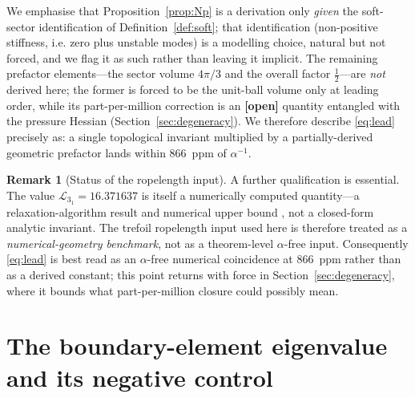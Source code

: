 \documentclass[11pt,a4paper]{article}
\theoremstyle{definition}
\newtheorem{remark}{Remark}
\newcommand{\open}{\textbf{[open]}}
\begin{document}
\noindent We emphasise that Proposition~\ref{prop:Np} is a derivation only
\emph{given} the soft-sector identification of Definition~\ref{def:soft}; that
identification (non-positive stiffness, i.e. zero plus unstable modes) is a
modelling choice, natural but not forced, and we flag it as such rather than
leaving it implicit. The remaining prefactor elements---the sector volume
$4\pi/3$ and the overall factor $\tfrac12$---are \emph{not} derived here; the
former is forced to be the unit-ball volume only at leading order, while its
part-per-million correction is an \open{} quantity entangled with the pressure
Hessian (Section~\ref{sec:degeneracy}). We therefore describe \eqref{eq:lead}
precisely as: a single topological invariant multiplied by a partially-derived
geometric prefactor lands within $866$~ppm of $\alpha^{-1}$.

\begin{remark}[Status of the ropelength input]
\label{rem:benchmark}
A further qualification is essential. The value $\mathcal{L}_{3_1}=16.371637$ is
itself a numerically computed quantity---a relaxation-algorithm result and
numerical upper bound
\cite{PieranskiPrzybyl2001IdealTrefoil,BaranskaPieranskiRawdon2004RopelengthPolygonal,AshtonCantarellaPiatekRawdon2005SelfContact},
not a closed-form analytic invariant. The trefoil ropelength input used here is
therefore treated as a \emph{numerical-geometry benchmark}, not as a theorem-level
$\alpha$-free input. Consequently \eqref{eq:lead} is best read as an $\alpha$-free
numerical coincidence at $866$~ppm rather than as a derived constant; this point
returns with force in Section~\ref{sec:degeneracy}, where it bounds what
part-per-million closure could possibly mean.
\end{remark}

\section{The boundary-element eigenvalue and its negative control}
\label{sec:bem}
\end{document}
